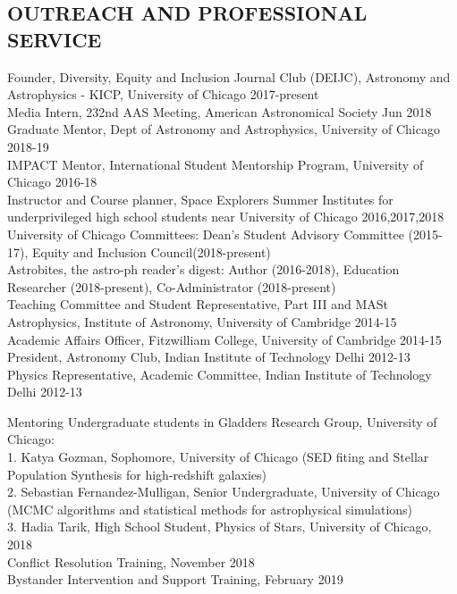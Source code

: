 \documentclass[margin]{res}
\begin{document}
\begin{resume}
\section{OUTREACH AND PROFESSIONAL SERVICE}
Founder, Diversity, Equity and Inclusion Journal Club (DEIJC), Astronomy and Astrophysics - KICP, University of Chicago \hfill 2017-present\\
Media Intern, 232nd AAS Meeting, American Astronomical Society \hfill Jun 2018\\
Graduate Mentor, Dept of Astronomy and Astrophysics, University of Chicago \hfill 2018-19\\
IMPACT Mentor, International Student Mentorship Program, University of Chicago \hfill 2016-18\\
Instructor and Course planner, Space Explorers Summer Institutes for underprivileged high school students near University of Chicago \hfill 2016,2017,2018\\
University of Chicago Committees: Dean's Student Advisory Committee (2015-17), Equity and Inclusion Council(2018-present)\\
Astrobites, the astro-ph reader's digest: Author (2016-2018), Education Researcher (2018-present), Co-Administrator (2018-present)\\
Teaching Committee and Student Representative, Part III and MASt Astrophysics, Institute of Astronomy, University of Cambridge \hfill 2014-15\\
Academic Affairs Officer, Fitzwilliam College, University of Cambridge \hfill 2014-15\\
President, Astronomy Club, Indian Institute of Technology Delhi \hfill 2012-13\\
Physics Representative, Academic Committee, Indian Institute of Technology Delhi \hfill 2012-13

Mentoring Undergraduate students in Gladders Research Group, University of Chicago:\\
1. Katya Gozman, Sophomore, University of Chicago (SED fiting and Stellar Population Synthesis for high-redshift galaxies)\\
2. Sebastian Fernandez-Mulligan, Senior Undergraduate, University of Chicago (MCMC algorithms and statistical methods for astrophysical simulations)\\
3. Hadia Tarik, High School Student, Physics of Stars, University of Chicago, 2018\\

Conflict Resolution Training, November 2018\\
Bystander Intervention and Support Training, February 2019



\end{resume}
\end{document}
